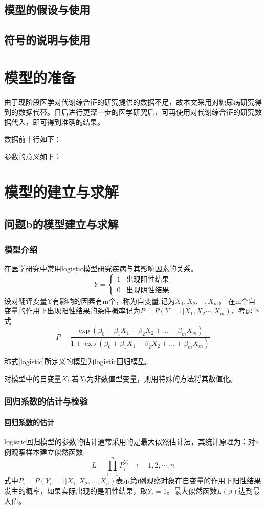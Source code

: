 \documentclass[bwprint]{cumcmthesis}
\begin{document}
\subsection{模型的假设与使用}
\subsection{符号的说明与使用}
\section{模型的准备}
由于现阶段医学对代谢综合征的研究提供的数据不足，故本文采用对糖尿病研究得到的数据代替。日后进行更深一步的医学研究后，可再使用对代谢综合征的研究数据代入，即可得到准确的结果。

数据前十行如下：

参数的意义如下：

\section{模型的建立与求解}
\subsection{问题b的模型建立与求解}
\subsubsection{模型介绍}
在医学研究中常用logistic模型研究疾病与其影响因素的关系。
\[ Y=\begin{cases}
1 &\text{出现阳性结果}\\
0 &\text{出现阴性结果}
\end{cases} \]
设对翻译变量Y有影响的因素有m个，称为自变量,记为$ X_{1},X_{2},\cdots,X_{m} $。
在m个自变量的作用下出现阳性结果的条件概率记为$ P=P(Y=1|X_{1},X_{2}\cdots,X_{m}) $，考虑下式
\begin{equation}
\label{logistic}
P=\dfrac{\exp(\beta_{0}+\beta_{1}X_{1}+\beta_{2}X_{2}+\ldots+\beta_{m}X_{m})}{1+\exp(\beta_{0}+\beta_{1}X_{1}+\beta_{2}X_{2}+\ldots+\beta_{m}X_{m})}
\end{equation}

称式\eqref{logistic}所定义的模型为logistic回归模型。

对模型中的自变量$ X_{i} $,若$ X_{i} $为非数值型变量，则用特殊的方法将其数值化。
\subsubsection{回归系数的估计与检验}
\paragraph{回归系数的估计}
logistic回归模型的参数的估计通常采用的是最大似然估计法，其统计原理为：对n例观察样本建立似然函数\[ L=\prod_{i=1}^{n}P_{i}^{Y_{i}}\quad i=1,2,\cdots,n \]
式中$ P_{i} =P(Y_{i}=1|X_{1},X_{2},\ldots,X_{n})$表示第i例观察对象在自变量的作用下阳性结果发生的概率，如果实际出现的是阳性结果，取$ Y_{i}=1 $。最大似然函数$ L(\beta) $达到最大值。
\end{document}

